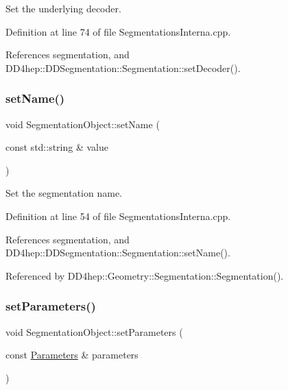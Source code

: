 Set the underlying decoder. 



Definition at line 74 of file Segmentations\+Interna.\+cpp.



References segmentation, and D\+D4hep\+::\+D\+D\+Segmentation\+::\+Segmentation\+::set\+Decoder().

\hypertarget{class_d_d4hep_1_1_geometry_1_1_segmentation_object_a2a00a3a453dd06de14f7341f8fb89aea}{}\label{class_d_d4hep_1_1_geometry_1_1_segmentation_object_a2a00a3a453dd06de14f7341f8fb89aea} 
\subsubsection{\texorpdfstring{set\+Name()}{setName()}}
{\footnotesize\ttfamily void Segmentation\+Object\+::set\+Name (\begin{DoxyParamCaption}\item[{const std\+::string \&}]{value }\end{DoxyParamCaption})}



Set the segmentation name. 



Definition at line 54 of file Segmentations\+Interna.\+cpp.



References segmentation, and D\+D4hep\+::\+D\+D\+Segmentation\+::\+Segmentation\+::set\+Name().



Referenced by D\+D4hep\+::\+Geometry\+::\+Segmentation\+::\+Segmentation().

\hypertarget{class_d_d4hep_1_1_geometry_1_1_segmentation_object_a8246875bc5c3dd4c4613bf56350690da}{}\label{class_d_d4hep_1_1_geometry_1_1_segmentation_object_a8246875bc5c3dd4c4613bf56350690da} 
\subsubsection{\texorpdfstring{set\+Parameters()}{setParameters()}}
{\footnotesize\ttfamily void Segmentation\+Object\+::set\+Parameters (\begin{DoxyParamCaption}\item[{const \hyperlink{class_d_d4hep_1_1_geometry_1_1_segmentation_object_adb4bb039e0cd15ea9fbe0232d07c49cc}{Parameters} \&}]{parameters }\end{DoxyParamCaption})}




